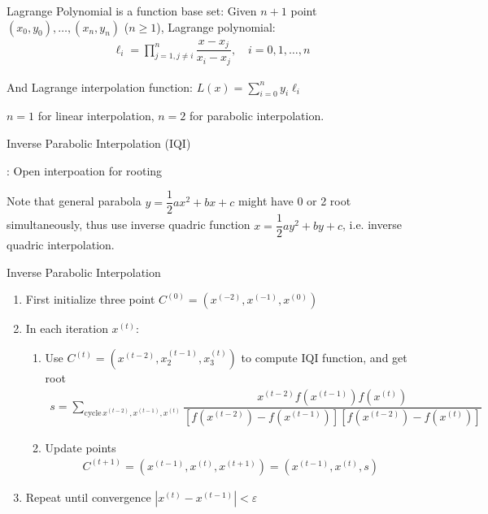     Lagrange Polynomial is a function base set: Given $ n+1 $ point $ (x_0,y_0),\ldots,(x_n,y_n) $ ($ n\geq 1 $), Lagrange polynomial:
\begin{align}
    \ell_i=\prod_{j=1,j\neq i}^n\dfrac{x-x_j}{x_i-x_j},\quad i=0,1,\ldots,n
\end{align}

    And Lagrange interpolation function: $ L(x)=\sum_{i=0}^ny_i\ell_i $

    $ n=1 $ for linear interpolation, $ n=2 $ for parabolic interpolation.


\begin{point}
    \hypertarget{InverseQuadric}{Inverse Parabolic Interpolation (IQI)}: Open interpoation for rooting
\end{point}

    Note that general parabola $ y=\dfrac{1}{2}ax^2+bx+c $ might have 0 or 2 root simultaneously, thus use inverse quadric function $ x=\dfrac{1}{2}ay^2+by+c $, i.e. inverse quadric interpolation.

\begin{algorithm}{Inverse Parabolic Interpolation}
    \begin{enumerate}[topsep=2pt,itemsep=2pt]
        \item First initialize three point $ C^{(0)}=\left(x^{(-2)},x^{(-1)},x^{(0)}\right) $
        \item In each iteration $ x^{(t)} $:
        \begin{enumerate}[topsep=2pt,itemsep=2pt]
            \item Use $ C^{(t)}=\left(x^{(t-2)},x_2^{(t-1)},x_3^{(t)}\right) $ to compute IQI function, and get root 
        \begin{align}
            s=\sum_{\mathrm{cycle}\,x^{(t-2)},x^{(t-1)},x^{(t)}}\dfrac{x^{(t-2)}f(x^{(t-1)})f(x^{(t)})}{\left[f(x^{(t-2)})-f(x^{(t-1)})\right]\left[f(x^{(t-2)})-f(x^{(t)})\right]}
        \end{align}
        \item Update points
        \begin{align}
             C^{(t+1)}=\left(x^{(t-1)},x^{(t)},x^{(t+1)}\right)=\left( x^{(t-1)},x^{(t)},s \right)
        \end{align}
        \end{enumerate}
        \item Repeat until convergence $ |x^{(t)}-x^{(t-1)}|<\varepsilon  $
    \end{enumerate}
\end{algorithm}
    


